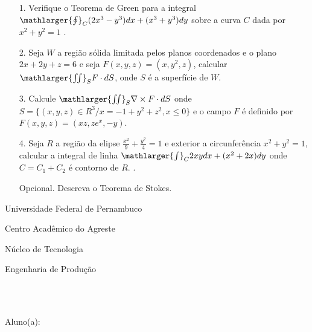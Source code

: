 \documentclass[oneside,a4paper,12pt]{article}
\newcommand{\universidade}{Universidade Federal de Pernambuco}
\newcommand{\centro}{Centro Acadêmico do Agreste}
\newcommand{\departamento}{Núcleo de Tecnologia}
\newcommand{\curso}{Engenharia de Produção}
\begin{document}
\begin{itemize}
\item[1.] Verifique o Teorema de Green para a integral $\mathlarger{\oint}_{C} (2x^{3}-y^{3})dx+(x^{3}+y^{3})dy$ sobre a curva $C$ dada por $x^{2}+y^{2}=1$ .
\end{itemize}
\begin{itemize}
\item[2.] Seja $W$ a região sólida limitada pelos planos coordenados e o plano $2x+2y+z=6$ e seja $F(x,y,z)=(x,y^{2},z)$, calcular $\mathlarger{\iint}_{S}F\cdot dS$, onde $S$ é a superfície de $W$. 
 \end{itemize}
 \begin{itemize}
\item [3.] Calcule $\mathlarger{\iint}_{S} \nabla \times F\cdot dS$ onde $S=\{(x,y,z)\in R^{3}/ x=-1+y^{2}+z^{2}, x\leq 0 \}$ e o campo $F$ é definido por $F(x,y,z)=(xz,ze^{x},-y)$.
\end{itemize}
\begin{itemize}
\item[4.]Seja $R$ a região da elipse $\frac{x^{2}}{9}+\frac{y^{2}}{4}=1$ e exterior a circunferência $x^{2}+y^{2}=1$, calcular a integral de linha $\mathlarger{\int}_{C}2xydx+(x^{2}+2x)dy$ onde $C=C_{1}+C_{2}$ é contorno de $R$. .
\end{itemize}
\begin{itemize}
	\item[Opcional.] Descreva o Teorema de Stokes.
\end{itemize}
     \begin{center}
     	\vspace{0pt}
     	
     	\universidade
     	\par
     	\centro
     	\par
     	\departamento
     	\par
     	\curso
     	\par
     	\vspace{08pt}
     	\\ \\
     \end{center}
     
     \begin{flushleft}
     	Aluno(a):
     \end{flushleft}
 
\end{document}
